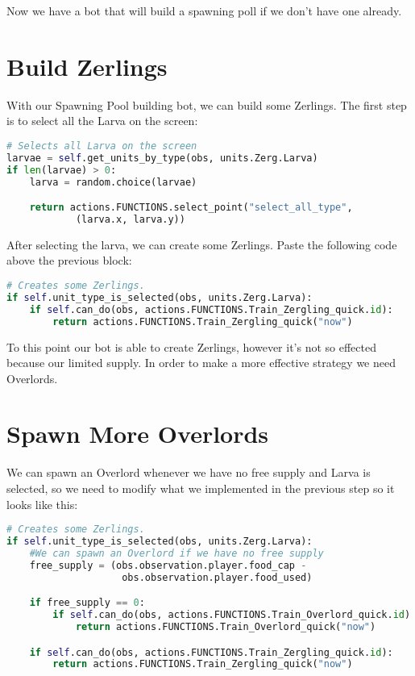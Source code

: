 \documentclass[11pt]{report}            %
\begin{document}
Now we have a bot that will build a spawning poll if we don't have one already.

\chapter{Build Zerlings}
With our Spawning Pool building bot, we can build some Zerlings. The first step is to select all the Larva on the screen:
\begin{lstlisting}[language=Python]
# Selects all Larva on the screen
larvae = self.get_units_by_type(obs, units.Zerg.Larva)
if len(larvae) > 0:
    larva = random.choice(larvae)

    return actions.FUNCTIONS.select_point("select_all_type",
            (larva.x, larva.y))
\end{lstlisting}

After selecting the larva, we can create some Zerlings. Paste the following code above the previous block:
\begin{lstlisting}[language=Python]
# Creates some Zerlings.
if self.unit_type_is_selected(obs, units.Zerg.Larva):
    if self.can_do(obs, actions.FUNCTIONS.Train_Zergling_quick.id):
        return actions.FUNCTIONS.Train_Zergling_quick("now")
\end{lstlisting}
To this point our bot is able to create Zerlings, however it's not so effected because our limited supply. In order to make a more effective strategy we need Overlords.

\chapter{Spawn More Overlords}
We can spawn an Overlord whenever we have no free supply and Larva is selected, so we need to modify what we implemented in the previous step so it looks like this:
\begin{lstlisting}[language=Python]
# Creates some Zerlings.
if self.unit_type_is_selected(obs, units.Zerg.Larva):
    #We can spawn an Overlord if we have no free supply
    free_supply = (obs.observation.player.food_cap -
                    obs.observation.player.food_used)

    if free_supply == 0:
        if self.can_do(obs, actions.FUNCTIONS.Train_Overlord_quick.id):
            return actions.FUNCTIONS.Train_Overlord_quick("now")

    if self.can_do(obs, actions.FUNCTIONS.Train_Zergling_quick.id):
        return actions.FUNCTIONS.Train_Zergling_quick("now")
\end{lstlisting}
\end{document}
